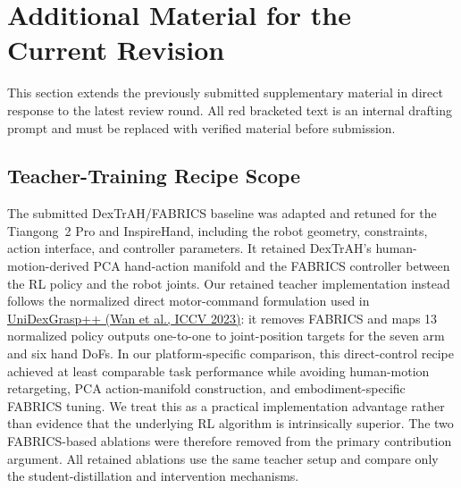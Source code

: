 \clearpage
\section{Additional Material for the Current Revision}
\label{app:round2_additions}

This section extends the previously submitted supplementary material in direct
response to the latest review round. All red bracketed text is an internal
drafting prompt and must be replaced with verified material before submission.

\subsection{Teacher-Training Recipe Scope}
\label{app:recipe_comparison}

The submitted DexTrAH/FABRICS baseline was adapted and retuned for the
Tiangong~2 Pro and InspireHand, including the robot geometry, constraints,
action interface, and controller parameters. It retained DexTrAH's
human-motion-derived PCA hand-action manifold and the FABRICS controller between
the RL policy and the robot joints. Our retained teacher implementation instead
follows the normalized direct motor-command formulation used in
\href{https://openaccess.thecvf.com/content/ICCV2023/html/Wan_UniDexGrasp_Improving_Dexterous_Grasping_Policy_Learning_via_Geometry-Aware_Curriculum_and_ICCV_2023_paper.html}{UniDexGrasp++ (Wan et al., ICCV 2023)}:
it removes FABRICS and maps 13 normalized policy outputs one-to-one to
joint-position targets for the seven arm and six hand DoFs. In our
platform-specific comparison, this direct-control recipe achieved at least
comparable task performance while avoiding human-motion retargeting, PCA
action-manifold construction, and embodiment-specific FABRICS tuning. We treat
this as a practical implementation advantage rather than evidence that the
underlying RL algorithm is intrinsically superior. The two FABRICS-based
ablations were therefore removed from the primary contribution argument. All
retained ablations use the same teacher setup and compare only the
student-distillation and intervention mechanisms.


